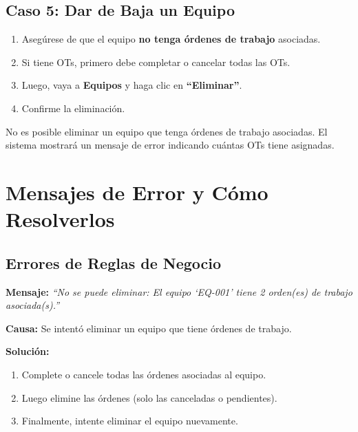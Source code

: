 \documentclass[12pt, a4paper]{article}
\begin{document}
\subsection{Caso 5: Dar de Baja un Equipo}

\begin{enumerate}[leftmargin=2em]
    \item Aseg\'urese de que el equipo \textbf{no tenga \'ordenes de trabajo} asociadas.
    \item Si tiene OTs, primero debe completar o cancelar todas las OTs.
    \item Luego, vaya a \textbf{Equipos} y haga clic en \textbf{``Eliminar''}.
    \item Confirme la eliminaci\'on.
\end{enumerate}

\begin{warnbox}
No es posible eliminar un equipo que tenga \'ordenes de trabajo asociadas. El sistema mostrar\'a un mensaje de error indicando cu\'antas OTs tiene asignadas.
\end{warnbox}

\newpage
\section{Mensajes de Error y C\'omo Resolverlos}

\subsection{Errores de Reglas de Negocio}

\begin{errorbox}
\textbf{Mensaje:} \textit{``No se puede eliminar: El equipo `EQ-001' tiene 2 orden(es) de trabajo asociada(s).''}

\textbf{Causa:} Se intent\'o eliminar un equipo que tiene \'ordenes de trabajo.

\textbf{Soluci\'on:}
\begin{enumerate}
    \item Complete o cancele todas las \'ordenes asociadas al equipo.
    \item Luego elimine las \'ordenes (solo las canceladas o pendientes).
    \item Finalmente, intente eliminar el equipo nuevamente.
\end{enumerate}
\end{errorbox}
\end{document}
